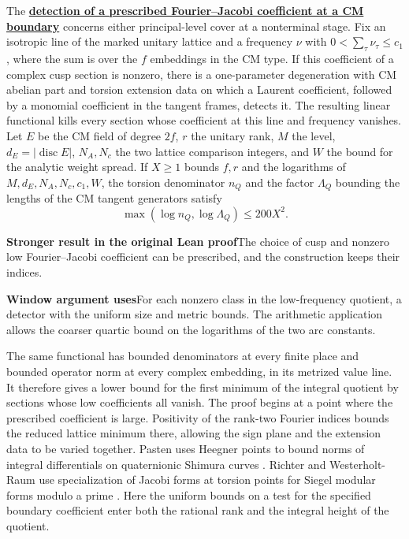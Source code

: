 \documentclass[11pt,a4paper]{article}
\newcommand{\rhscopelabel}[2]{%
  {\setlength{\fboxsep}{2pt}\colorbox{#1}{%
    \small\sffamily\bfseries\color{PageInk}#2}}}
\newcommand{\rhrange}[3][Stronger result in the original Lean release]{%
  \par\addvspace{.45\baselineskip}\Needspace{4\baselineskip}%
  \begingroup\setlength{\leftskip}{.65em}\setlength{\parindent}{0pt}%
  \noindent\rhscopelabel{TraceTint}{#1}\enspace#2\par
  \nobreak\smallskip
  \noindent\rhscopelabel{FieldTint}{Window argument uses}\enspace#3\par
  \endgroup\addvspace{.45\baselineskip}}
\begin{document}
The \textbf{\hyperlink{candidate.cm-boundary-fourier-jacobi}{detection of a
prescribed Fourier--Jacobi coefficient at a CM boundary}} concerns
either principal-level cover at a nonterminal stage. Fix an isotropic
line of the marked unitary lattice and a frequency \(\nu\) with
\(0<\sum_{\tau}\nu_\tau\le c_1\), where the sum is over the \(f\)
embeddings in the CM type.
If this coefficient of a complex cusp section is nonzero, there is
a one-parameter degeneration with CM abelian part and torsion
extension data on which a Laurent coefficient, followed by a monomial
coefficient in the tangent frames, detects it. The resulting linear
functional kills every section whose coefficient at this line and
frequency vanishes. Let \(E\) be the CM field of degree \(2f\),
\(r\) the unitary rank, \(M\) the level, \(d_E=|\operatorname{disc}E|\),
\(N_A,N_c\) the two lattice comparison integers, and
\(W\) the bound for the analytic weight spread. If \(X\ge1\) bounds
\(f,r\) and the logarithms of \(M,d_E,N_A,N_c,c_1,W\), the torsion
denominator \(n_Q\) and the factor \(\Lambda_Q\) bounding the lengths
of the CM tangent generators satisfy
\[
       \max(\log n_Q,\log\Lambda_Q)\le 200X^2 .
\]
\rhrange[Stronger result in the original Lean proof]{The choice of cusp and
nonzero low Fourier--Jacobi coefficient can be prescribed, and the
construction keeps their indices.}
{For each nonzero class in the low-frequency quotient, a detector
with the uniform size and metric bounds. The arithmetic application
allows the coarser quartic bound on the logarithms of the two arc
constants.}
The same functional has bounded denominators at every finite place
and bounded operator norm at every complex embedding, in its
metrized value line. It therefore gives a lower bound for the
first minimum of the integral quotient by sections whose low
coefficients all vanish. The proof begins at a point where the
prescribed coefficient is large. Positivity of the rank-two Fourier
indices bounds the reduced lattice minimum there, allowing the
sign plane and the extension data to be varied together.
Pasten uses Heegner points to bound norms of integral differentials
on quaternionic Shimura curves \cite[\S\S13--14]{pasten-cm-norm}.
Richter and Westerholt-Raum use specialization of Jacobi forms at
torsion points for Siegel modular forms modulo a prime
\cite[proof of Proposition~2.4]{richter-westerholt-sturm}. Here the
uniform bounds on a test for the specified boundary coefficient enter
both the rational rank and the integral height of the quotient.


\end{document}
